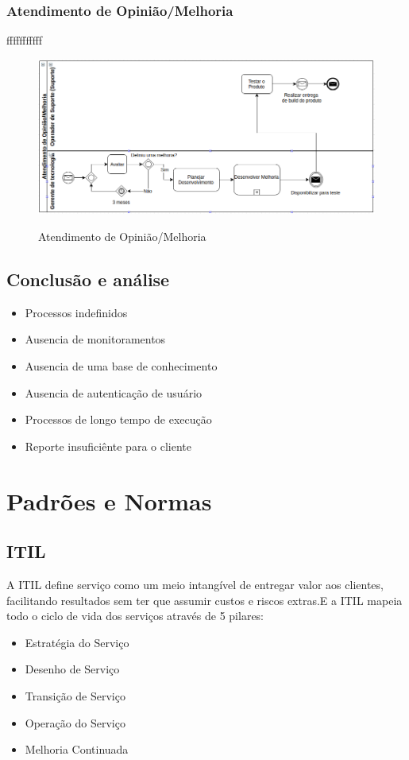 \documentclass[11pt,a4paper]{article}
\begin{document}
\subsubsection{Atendimento de Opinião/Melhoria}
fffffffffff
\begin{figure}[!h]
\caption{Atendimento de Opinião/Melhoria}
\centering %
\includegraphics[width=15cm]{as-is/04_atendimento_de_melhoria.png}
\label{figura:atendimento_de_melhoria_as_is}
\end{figure}


\subsection{Conclusão e análise}
\begin{itemize}[noitemsep]
  \item Processos indefinidos
  \item Ausencia de monitoramentos
  \item Ausencia de uma base de conhecimento
  \item Ausencia de autenticação de usuário
  \item Processos de longo tempo de execução
  \item Reporte insuficiênte para o cliente
\end{itemize}

\section{Padrões e Normas}
\subsection{ITIL}

A ITIL define serviço como um meio intangível de entregar valor aos clientes,
facilitando resultados sem ter que assumir custos e riscos extras.E a ITIL mapeia 
todo o ciclo de vida dos serviços através de 5 pilares:
\begin{itemize}[noitemsep]
  \item Estratégia do Serviço
  \item Desenho de Serviço
  \item Transição de Serviço
  \item Operação do Serviço
  \item Melhoria Continuada
\end{itemize}
\end{document}
